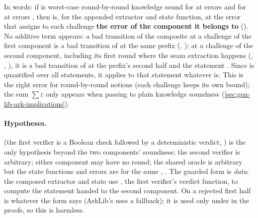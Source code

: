 In words: if  is worst-case round-by-round knowledge sound for  at errors
 and  for  at errors , then  is, for
the appended extractor and state function, at the error that assigns to each challenge \textbf{the
error of the component it belongs to} (\allowbreak{}\allowbreak{}\allowbreak{}). No
additive term appears: a bad transition of the composite at a challenge of the first component is
a bad transition of  at the same prefix (, ); at a
challenge of the second component, including its first round where the seam extraction happens
(, , ), it is a bad transition of
 at the prefix's second half and the statement . Since  is
quantified over all statements, it applies to that statement whatever  is. This is the
right error for round-by-round notions (each challenge keeps its own bound); the sum
$\sum \varepsilon$ only appears when passing to plain knowledge soundness
(\cref{sec:gen-lib-ark-implications}).

\paragraph{Hypotheses.}  (the first verifier is a Boolean check followed
by a deterministic verdict, \allowbreak{}) is the only hypothesis beyond the two
components' soundness; the second verifier is arbitrary; either component may have no round; the
shared oracle is arbitrary but the state functions and errors are for the same ,
. The guarded form is \emph{data}: the composed extractor and state use ,
the first verifier's verdict function, to compute the statement handed to the second component.
On a rejected first half  is whatever the form says (ArkLib's  uses a
fallback); it is used only under  in the proofs, so this is harmless.

